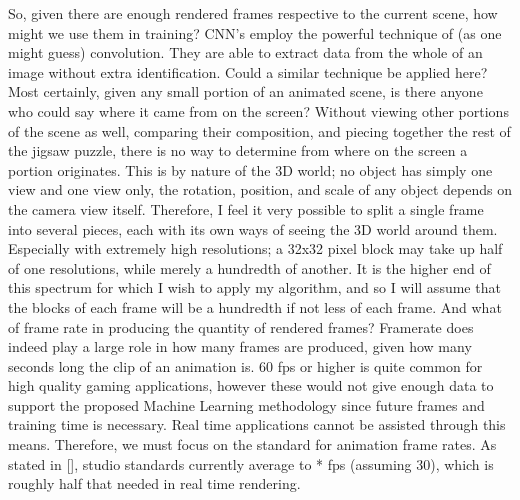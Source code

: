 \documentclass[conference]{IEEEtran}
\begin{document}
So, given there are enough rendered frames respective to the current scene,
how might we use them in training? CNN's employ the powerful technique of (as one might guess) convolution.
They are able to extract data from the whole of an image without extra identification.
Could a similar technique be applied here? Most certainly, given any small portion of an animated scene,
is there anyone who could say where it came from on the screen?
Without viewing other portions of the scene as well, comparing their composition,
and piecing together the rest of the jigsaw puzzle, there is no way to determine from where on the screen a portion originates.
This is by nature of the 3D world; no object has simply one view and one view only,
the rotation, position, and scale of any object depends on the camera view itself.
Therefore, I feel it very possible to split a single frame into several pieces,
each with its own ways of seeing the 3D world around them.
Especially with extremely high resolutions; a 32x32 pixel block may take up half of one resolutions,
while merely a hundredth of another. It is the higher end of this spectrum for which I wish to apply my algorithm,
and so I will assume that the blocks of each frame will be a hundredth if not less of each frame.
And what of frame rate in producing the quantity of rendered frames?
Framerate does indeed play a large role in how many frames are produced,
given how many seconds long the clip of an animation is.
60 fps or higher is quite common for high quality gaming applications,
however these would not give enough data to support the proposed
Machine Learning methodology since future frames and training time is necessary.
Real time applications cannot be assisted through this means.
Therefore, we must focus on the standard for animation frame rates.
As stated in [], studio standards currently average to * fps (assuming 30),
which is roughly half that needed in real time rendering.
\end{document}
